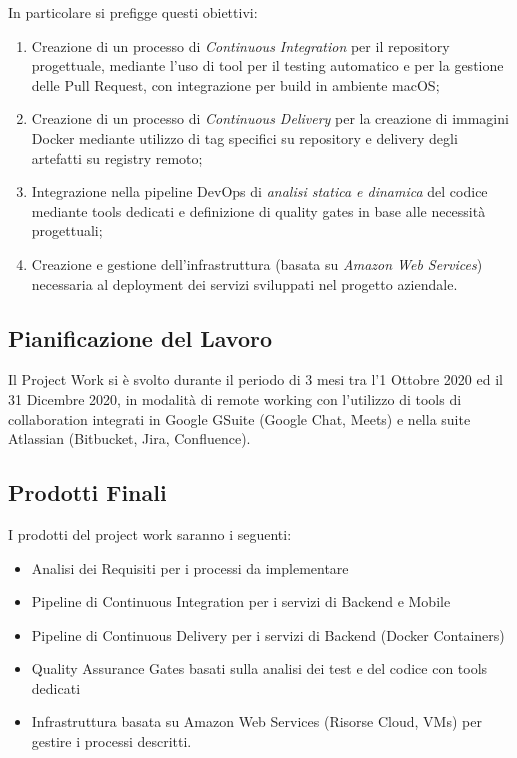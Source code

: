 \documentclass[a4paper,12pt]{report}
\begin{document}
			In particolare si prefigge questi obiettivi:
			\begin{enumerate}
				\item Creazione di un processo di \emph{Continuous Integration} per il repository progettuale, mediante l'uso di tool per il testing automatico e per la gestione delle Pull Request, con integrazione per build in ambiente macOS;
				\item Creazione di un processo di \emph{Continuous Delivery} per la creazione di immagini Docker mediante utilizzo di tag specifici su repository e delivery degli artefatti su registry remoto;
				\item Integrazione nella pipeline DevOps di \emph{analisi statica e dinamica} del codice mediante tools dedicati e definizione di quality gates in base alle necessità progettuali;
				\item Creazione e gestione dell'infrastruttura (basata su \emph{Amazon Web Services}) necessaria al deployment dei servizi sviluppati nel progetto aziendale.
			\end{enumerate}
	
		\subsection{Pianificazione del Lavoro}
	
			Il Project Work si è svolto durante il periodo di 3 mesi tra l'1 Ottobre 2020 ed il 31 Dicembre 2020, in modalità di remote
			working con l'utilizzo di tools di collaboration integrati in Google GSuite (Google Chat, Meets) e nella suite Atlassian
			(Bitbucket, Jira, Confluence).
			
	
		\subsection{Prodotti Finali}
		
			I prodotti del project work saranno i seguenti:
			\begin{itemize}
				\item Analisi dei Requisiti per i processi da implementare
				\item Pipeline di Continuous Integration per i servizi di Backend e Mobile
				\item Pipeline di Continuous Delivery per i servizi di Backend (Docker Containers)
				\item Quality Assurance Gates basati sulla analisi dei test e del codice con tools dedicati
				\item Infrastruttura basata su Amazon Web Services (Risorse Cloud, VMs) per gestire i processi descritti.
			\end{itemize}
	
\end{document}
